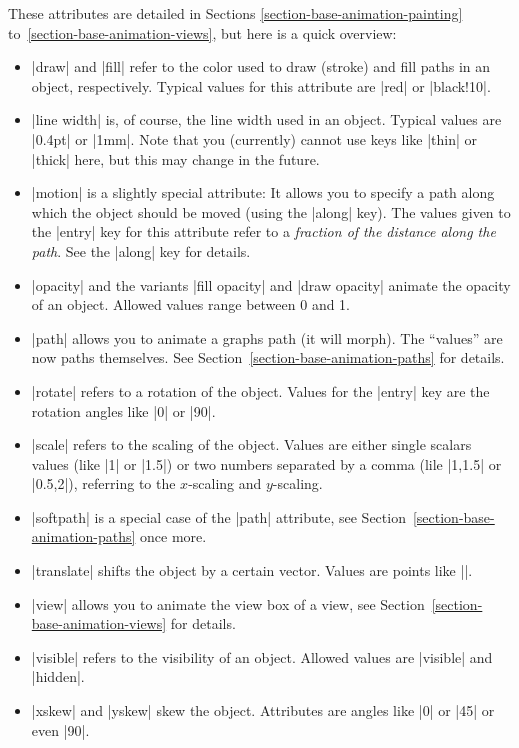 \begin{command}{\pgfanimateattribute{}}
  These attributes are detailed in
  Sections \ref{section-base-animation-painting}
  to~\ref{section-base-animation-views}, but here is a quick overview:
  \begin{itemize}
  \item |draw| and |fill| refer to the color used to
    draw (stroke) and fill paths in an object, respectively. Typical
    values for this attribute are |red| or |black!10|.
  \item |line width| is, of course, the line width used in an
    object. Typical values are |0.4pt| or |1mm|. Note that you
    (currently) cannot use keys like |thin| or |thick| here, but this
    may change in the future.
  \item |motion| is a slightly special attribute: It allows you to
    specify a path along which the object should be moved (using the
    |along| key). The values given to the |entry| key for this
    attribute refer to a \emph{fraction of the distance along the
      path}. See the |along| key for details.
  \item |opacity| and the variants |fill opacity| and |draw opacity|
    animate the opacity of an object. Allowed values range between 0
    and 1.
  \item |path| allows you to animate a graphs path (it will
    morph). The ``values'' are now paths themselves. See
    Section~\ref{section-base-animation-paths} for details.
  \item |rotate| refers to a rotation of the object. Values for the
    |entry| key are the rotation angles like |0| or |90|.
  \item |scale| refers to the scaling of the object. Values are either
    single scalars values (like |1| or  |1.5|) or two numbers
    separated by a comma (lile |1,1.5| or |0.5,2|), referring to the
    $x$-scaling and $y$-scaling.
  \item |softpath| is a special case of the |path| attribute, see
    Section~\ref{section-base-animation-paths} once more.
  \item |translate| shifts the object by a certain vector. Values are
    points like |\pgfpoint{1cm}{2cm}|.
  \item |view| allows you to animate the view box of a view, see
    Section~\ref{section-base-animation-views} for details.
  \item |visible| refers to the visibility of an object. Allowed
    values are |visible| and |hidden|.
  \item |xskew| and |yskew| skew the object. Attributes are angles
    like |0| or |45| or even |90|.
  \end{itemize}


\end{command}
